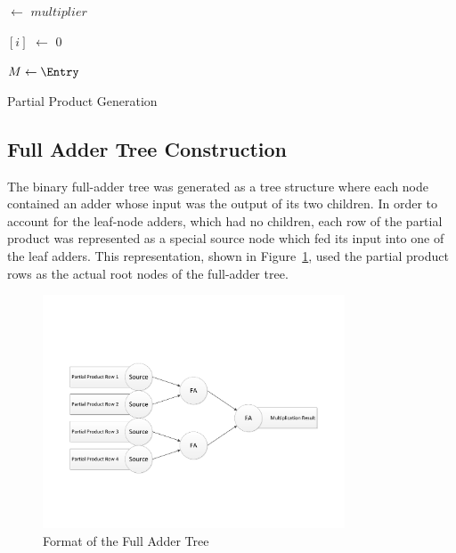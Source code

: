 \documentclass{article}
\begin{document}
\begin{algorithm}[h]
		
	
	\BlankLine
	\Entry $\leftarrow$ $multiplier$\;
	\BlankLine
	
	{
		\Entry$[i]$ $\leftarrow$ 0\;
	}
	\BlankLine
	
	{
		{
			$M \leftarrow \Entry$\;
		}
		\Shift{\Entry}\;
	}
	\caption{Partial Product Generation}
	\label{PartialProduct}
\end{algorithm}

\subsection{Full Adder Tree Construction}
The binary full-adder tree was generated as a tree structure where each node contained an adder whose input was the output of its two children. In order to account for the leaf-node adders, which had no children, each row of the partial product was represented as a special source node which fed its input into one of the leaf adders. This representation, shown in Figure~\ref{TreeFormat}, used the partial product rows as the actual root nodes of the full-adder tree.

\begin{figure}[h]
	\begin{center}
	\includegraphics[width=0.8\textwidth]{TreeFormat}
	\end{center}
	\caption{Format of the Full Adder Tree}
	\label{TreeFormat}
\end{figure}
\end{document}

